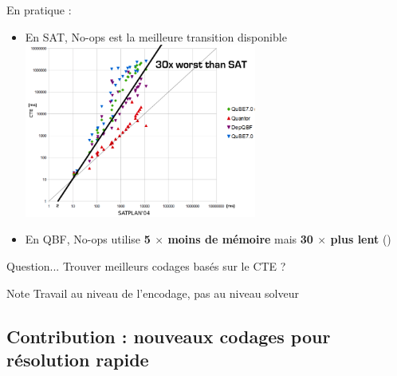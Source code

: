 \documentclass[english,french,usenames,dvipsnames]{beamer}
\begin{document}
\begin{frame}
En pratique :
\begin{itemize}
\item En SAT, No-ops est la meilleure transition disponible
\includegraphics[width=0.6\textwidth]{figures/coplas2018/cashmore.png}
\item En QBF, No-ops utilise \textbf{5 $ \times $ moins de mémoire} mais \textbf{30 $ \times $ plus lent} (\cite{DBLP:conf/ecai/CashmoreFG12})
\end{itemize}
\end{frame}





\begin{frame}
\begin{exampleblock}{Question...}
Trouver meilleurs codages basés sur le CTE ?
\end{exampleblock}
\begin{alertblock}{Note}
Travail au niveau de l'encodage, {\color{red} pas au niveau solveur}
\end{alertblock}
\end{frame}


\subsection{Contribution : nouveaux codages pour résolution rapide}
\end{document}
